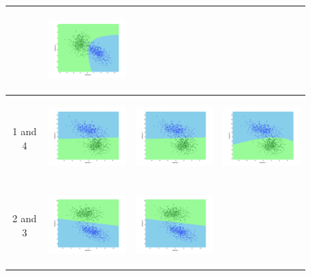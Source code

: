 \documentclass[a4paper]{article}
\begin{document}
\begin{figure}
\begin{tabular}{|c|c|c|c|}
				&\includegraphics[width=40mm,height=30mm]{bayes/over/pair/13/diff_cov.png}\\
				\hline
				1 and
				4&\includegraphics[width=40mm,height=30mm]{bayes/over/pair/14/all_cov.png}&\includegraphics[width=40mm,height=30mm]{bayes/over/pair/14/avg_cov.png}
				&\includegraphics[width=40mm,height=30mm]{bayes/over/pair/14/diff_cov.png}\\
				\hline
				2 and
				3&\includegraphics[width=40mm,height=30mm]{bayes/over/pair/23/all_cov.png}&\includegraphics[width=40mm,height=30mm]{bayes/over/pair/23/avg_cov.png}

\end{tabular}
\end{figure}
\end{document}

